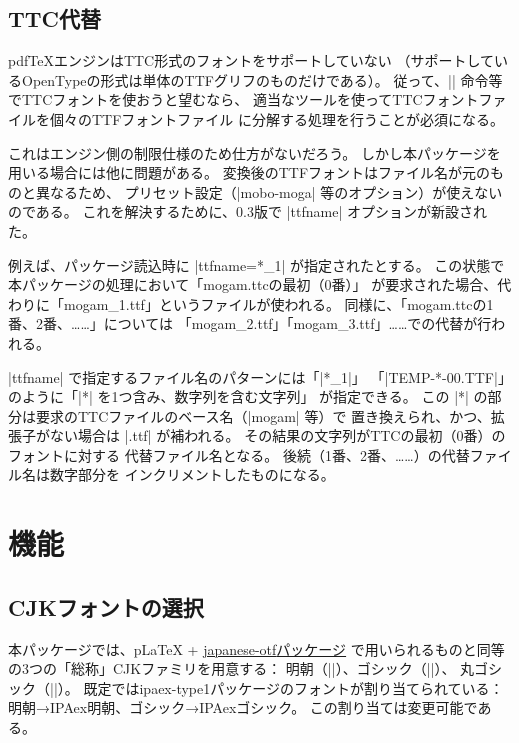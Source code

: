 \documentclass[a4paper]{ltjsarticle}
\newcommand{\Pkg}[1]{\textsf{#1}}
\providecommand{\pLaTeX}{p\LaTeX}
\providecommand{\pdfTeX}{pdf\/\TeX}
\begin{document}
\subsection{TTC代替}

{\pdfTeX}エンジンはTTC形式のフォントをサポートしていない
（サポートしているOpenTypeの形式は単体のTTFグリフのものだけである）。
従って、|\setminchofont| 命令等でTTCフォントを使おうと望むなら、
適当なツールを使ってTTCフォントファイルを個々のTTFフォントファイル
に分解する処理を行うことが必須になる。

これはエンジン側の制限仕様のため仕方がないだろう。
しかし本パッケージを用いる場合には他に問題がある。
変換後のTTFフォントはファイル名が元のものと異なるため、
プリセット設定（|mobo-moga| 等のオプション）が使えないのである。
これを解決するために、0.3版で |ttfname| オプションが新設された。

例えば、パッケージ読込時に |ttfname=*_1| が指定されたとする。
この状態で本パッケージの処理において「mogam.ttcの最初（0番）」
が要求された場合、代わりに「mogam\_1.ttf」というファイルが使われる。
同様に、「mogam.ttcの1番、2番、……」については
「mogam\_2.ttf」「mogam\_3.ttf」……での代替が行われる。

|ttfname| で指定するファイル名のパターンには「|*_1|」
「|TEMP-*-00.TTF|」のように「|*| を1つ含み、数字列を含む文字列」
が指定できる。
この |*| の部分は要求のTTCファイルのベース名（|mogam| 等）で
置き換えられ、かつ、拡張子がない場合は |.ttf| が補われる。
その結果の文字列がTTCの最初（0番）のフォントに対する
代替ファイル名となる。
後続（1番、2番、……）の代替ファイル名は数字部分を
インクリメントしたものになる。

\section{機能}
\label{sec:usage}

\subsection{CJKフォントの選択}

本パッケージでは、{\pLaTeX} +
\href{http://www.ctan.org/pkg/japanese-otf}{\Pkg{japanese-otf}パッケージ}%
で用いられるものと同等の3つの「総称」CJKファミリを用意する：
明朝（|\mcfamily|）、ゴシック（|\gtfamily|）、
丸ゴシック（|\mgfamily|）。
既定では\Pkg{ipaex-type1}パッケージのフォントが割り当てられている：
明朝→IPAex明朝、ゴシック→IPAexゴシック。
この割り当ては変更可能である。
\end{document}
